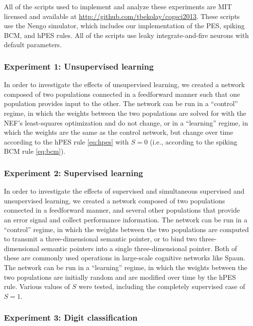 \documentclass[10pt,letterpaper]{article}
\begin{document}
All of the scripts used to implement
and analyze these experiments
are MIT licensed and available at
\url{http://github.com/tbekolay/cogsci2013}.
These scripts use the Nengo simulator,
which includes our implementation
of the PES, spiking BCM, and hPES rules.
All of the scripts use leaky integrate-and-fire
neurons with default parameters.

\subsubsection{Experiment 1: Unsupervised learning}

In order to investigate the effects
of unsupervised learning,
we created a network composed of two populations
connected in a feedforward manner
such that one population provides input to the other.
The network can be run in a ``control'' regime,
in which the weights between the two populations
are solved for with the NEF's least-squares optimization
and do not change, or in a ``learning'' regime,
in which the weights are the same as the control network,
but change over time according to the hPES rule \eqref{eq:hpes}
with $S = 0$ (i.e., according to the spiking BCM rule \eqref{eq:bcm}).

\subsubsection{Experiment 2: Supervised learning}

In order to investigate the effects
of supervised and
simultaneous supervised and unsupervised learning,
we created a network composed of two populations
connected in a feedforward manner,
and several other populations that provide
an error signal and collect performance information.
The network can be run in a ``control'' regime,
in which the weights between the two populations
are computed to transmit a three-dimensional semantic pointer,
or to bind two three-dimensional semantic pointers
into a single three-dimensional pointer.
Both of these are commonly used operations
in large-scale cognitive networks like Spaun.
The network can be run in a ``learning'' regime,
in which the weights between the two populations
are initially random
and are modified over time by the hPES rule.
Various values of $S$ were tested,
including the completely supervised case of $S = 1$.

\subsubsection{Experiment 3: Digit classification}
\end{document}
